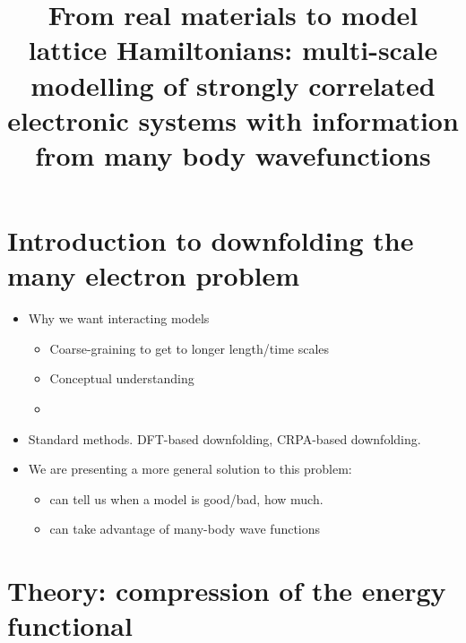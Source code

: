 \documentclass[prl,12pt,onecolumn,nofootinbib,notitlepage,english,superscriptaddress]{revtex4-1}
\newcommand{\lucas}[1]{{\color{GREEN}{\bf LKW: #1}}}
\begin{document}
\renewcommand{\thefootnote}{\fnsymbol{footnote}}
\renewcommand\abstractname{}
\title{From real materials to model lattice Hamiltonians: multi-scale modelling of strongly correlated electronic systems 
       with information from many body wavefunctions}

\maketitle




\section{Introduction to downfolding the many electron problem}
\begin{itemize}
\item Why we want interacting models
	\begin{itemize}
	\item Coarse-graining to get to longer length/time scales
	\item Conceptual understanding 
	\item \lucas{other thoughts?} 
	\end{itemize}
\item Standard methods. DFT-based downfolding, CRPA-based downfolding. \lucas{What is the issue with these methods? Accuracy? Being able to tell if a model is good or not? This will determine what we talk about in the paper. When are these methods good?} 
\item We are presenting a more general solution to this problem:
   \begin{itemize}
      \item  can tell us when a model is good/bad, how much.
      \item  can take advantage of many-body wave functions
    \end{itemize}
\end{itemize}

\section{Theory: compression of the energy functional}
\end{document}
